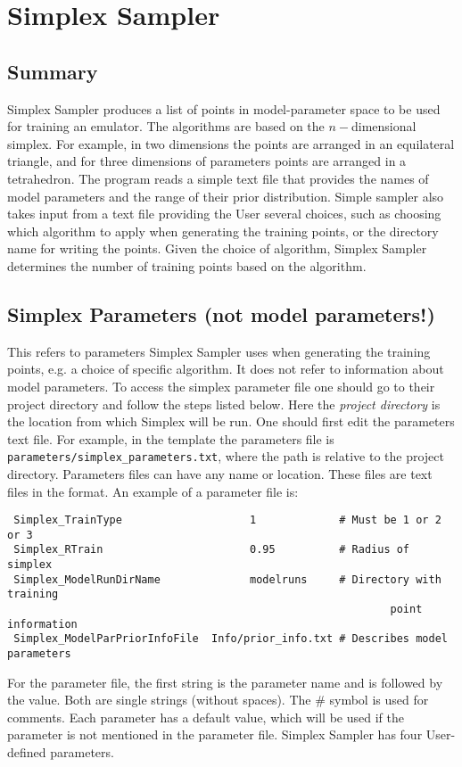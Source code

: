 \documentclass[main.tex]{subfiles}
\begin{document}
\newpage
\setcounter{section}{2}

\section{Simplex Sampler}

\subsection{Summary}
Simplex Sampler produces a list of points in model-parameter space to be used for training an emulator. The algorithms are based on the $n-$dimensional simplex. For example, in two dimensions the points are arranged in an equilateral triangle, and for three dimensions of parameters points are arranged in a tetrahedron. The program reads a simple text file that provides the names of model parameters and the range of their prior distribution. Simple sampler also takes input from a text file providing the User several choices, such as choosing which algorithm to apply when generating the training points, or the directory name for writing the points. Given the choice of algorithm, Simplex Sampler determines the number of training points based on the algorithm.

\subsection{Simplex Parameters (not model parameters!)}

This refers to parameters Simplex Sampler uses when generating the training points, e.g. a choice of specific algorithm. It does not refer to information about model parameters. To access the simplex parameter file one should go to their project directory and follow the steps listed below. Here the {\it project directory} is the location from which Simplex will be run. One should first edit the parameters text file. For example, in the template the parameters file is {\tt parameters/simplex\_parameters.txt}, where the path is relative to the project directory.
Parameters files can have any name or location. These files are text files in the format. An example of a parameter file is:\\
{\tt\begin{verbatim}
 Simplex_TrainType                    1             # Must be 1 or 2 or 3
 Simplex_RTrain                       0.95          # Radius of simplex
 Simplex_ModelRunDirName              modelruns     # Directory with training
                                                            point information
 Simplex_ModelParPriorInfoFile  Info/prior_info.txt # Describes model parameters
\end{verbatim}
}
For the parameter file, the first string is the parameter name and is followed by the value. Both are single strings (without spaces). The \# symbol is used for comments. Each parameter has a default value, which will be used if the parameter is not mentioned in the parameter file.  Simplex Sampler has four User-defined parameters.
    
\end{document}
